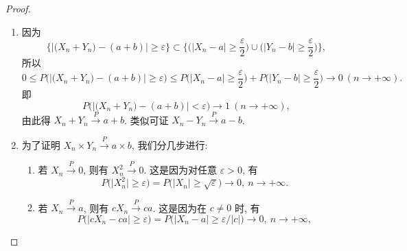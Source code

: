 \begin{proof}
    \begin{enumerate}
        \item\label{thm:4.3.1.1} 因为
        \begin{equation*}
            \bigl\{ \bigl\lvert \bigl( X_n + Y_n \bigr) - ( a + b ) \bigr\rvert \geq \varepsilon \bigr\} \subset \biggl\{ \biggl( \bigl\lvert X_n - a \bigr\rvert \geq \frac{\varepsilon}{2} \biggr) \cup \biggl( \bigl\lvert Y_n - b \bigr\rvert \geq \frac{\varepsilon}{2} \biggr) \biggr\},
        \end{equation*}
        所以
        \begin{equation*}
            0 \leq P \bigl( \big\lvert \bigl( X_n + Y_n \bigr) - ( a + b ) \bigr\rvert \geq \varepsilon \bigr)
            \leq P \biggl( \bigl\lvert X_n - a \bigr\rvert \geq \frac{\varepsilon}{2} \biggr) + P \biggl( \bigl\lvert Y_n - b \bigr\rvert \geq \frac{\varepsilon}{2} \biggr) \to 0 \ ( n \to +\infty ).
        \end{equation*}
        即
        \begin{equation*}
            P \bigl( \bigl\lvert \bigl( X_n + Y_n ) - ( a + b ) \bigr\rvert < \varepsilon \bigr) \to 1 \ ( n \to +\infty ),
        \end{equation*}
        由此得 $ X_n + Y_n \stackrel{P}{\to} a + b $.
        类似可证 $ X_n - Y_n \stackrel{P}{\to} a - b $.
        \item\label{thm:4.3.1.2} 为了证明 $ X_n \times Y_n \stackrel{P}{\to} a \times b $, 我们分几步进行:
        \begin{enumerate}
            \item 若 $ X_n \stackrel{P}{\to} 0 $, 则有 $ X_n^2 \stackrel{P}{\to} 0 $.
            这是因为对任意 $ \varepsilon > 0 $, 有
            \begin{equation*}
                P \bigl( \bigl\lvert X_n^2 \bigr\rvert \geq \varepsilon \bigr) = P \bigl( \bigl\lvert X_n \bigr\rvert \geq \sqrt{\varepsilon} \bigr) \to 0, \ n \to + \infty.
            \end{equation*}
            \item 若 $ X_n \stackrel{P}{\to} a $, 则有 $ cX_n \stackrel{P}{\to} ca $. 这是因为在 $ c \neq 0 $ 时, 有
            \begin{equation*}
                P \bigl( \bigl\lvert c X_n - ca \bigr\rvert \geq \varepsilon \bigr) = P \bigl( \bigl\lvert X_n - a \bigr\rvert \geq \varepsilon/\lvert c \rvert \bigr) \to 0, \ n \to +\infty,
            \end{equation*}

\end{enumerate}
\end{enumerate}
\end{proof}
